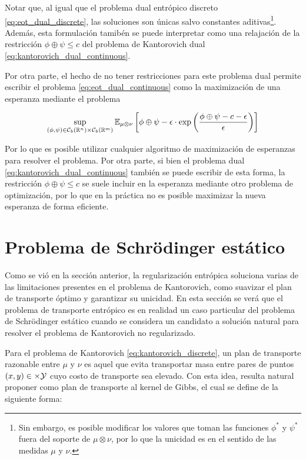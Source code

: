 Notar que, al igual que el problema dual entrópico discreto \eqref{eq:eot_dual_discrete}, las soluciones son únicas salvo constantes aditivas\footnote{Sin embargo, es posible modificar los valores que toman las funciones $\phi^*$ y $\psi^*$ fuera del soporte de $\mu\otimes\nu$, por lo que la unicidad es en el sentido de las medidas $\mu$ y $\nu$.}. Además, esta formulación tamibén se puede interpretar como una relajación de la restricción $\phi\oplus\psi\leq c$ del problema de Kantorovich dual \eqref{eq:kantorovich_dual_continuous}.

Por otra parte, el hecho de no tener restricciones para este problema dual permite escribir el problema \eqref{eq:eot_dual_continuous} como la maximización de una esperanza mediante el problema

\begin{equation}
	\sup_{(\phi,\psi)\in \mathcal{C}_b\left(\mathbb{R}^n\right)\times \mathcal{C}_b\left(\mathbb{R}^m\right)}
	\mathbb{E}_{\mu\otimes\nu}\left[\phi\oplus\psi - \epsilon\cdot \exp\left(\frac{\phi\oplus\psi - c - \epsilon}{\epsilon}\right)\right]
\end{equation}

Por lo que es posible utilizar cualquier algoritmo de maximización de esperanzas para resolver el problema. Por otra parte, si bien el problema dual \eqref{eq:kantorovich_dual_continuous} también se puede escribir de esta forma, la restricción $\phi\oplus\psi\leq c$ se suele incluir en la esperanza mediante otro problema de optimización, por lo que en la práctica no es posible maximizar la nueva esperanza de forma eficiente.

\section{Problema de Schrödinger estático}
\label{eot_sbp/static_sbp}

Como se vió en la sección anterior, la regularización entrópica soluciona varias de las limitaciones presentes en el problema de Kantorovich, como suavizar el plan de transporte óptimo y garantizar su unicidad. En esta sección se verá que el problema de transporte entrópico es en realidad un caso particular del problema de Schrödinger estático cuando se considera un candidato a solución natural para resolver el problema de Kantorovich no regularizado.

Para el problema de Kantorovich \eqref{eq:kantorovich_discrete}, un plan de transporte razonable entre $\mu$ y $\nu$ es aquel que evita transportar masa entre pares de puntos $(x,y)\in\times\mathcal{Y}$ cuyo costo de transporte sea elevado. Con esta idea, resulta natural proponer como plan de transporte al kernel de Gibbs, el cual se define de la siguiente forma:

